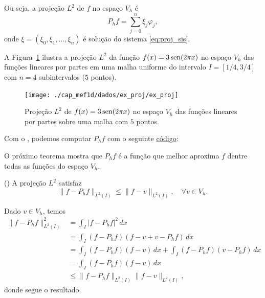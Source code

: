 Ou seja, a projeção $L^2$ de $f$ no espaço $V_h$ é
\begin{equation}
  P_hf = \sum_{j=0}^n\xi_j\varphi_j,
\end{equation}
onde $\xi = (\xi_0, \xi_1, \dotsc, \xi_n)$ é solução do sistema \eqref{eq:proj_sis}.

\begin{ex}\label{ex:proj}
  A Figura~\ref{fig:ex_proj} ilustra a projeção $L^2$ da função $f(x)=3\operatorname{sen}(2\pi x)$ no espaço $V_h$ das funções lineares por partes em uma malha uniforme do intervalo $I=[1/4, 3/4]$ com $n=4$ subintervalos ($5$ pontos). 

  \begin{figure}[h!]
    \centering
    \texttt{[image: ./cap\_mef1d/dados/ex\_proj/ex\_proj]}
    \caption{Projeção $L^2$ de $f(x)=3\operatorname{sen}(2\pi x)$ no espaço $V_h$ das funções lineares por partes sobre uma malha com $5$ pontos.}
    \label{fig:ex_proj}
  \end{figure}

\ifispython
Com o \fenics, podemos computar $P_h f$ com o seguinte \href{https://github.com/phkonzen/notas/blob/master/src/MetodoElementosFinitos/cap_mef1d/dados/ex_proj/ex_proj.py}{código}:

\fi
\end{ex}

O próximo teorema mostra que $P_h f$ é a função que melhor aproxima $f$ dentre todas as funções do espaço $V_h$.

\begin{teo}()\label{teo:melhor_aprox}
  A projeção $L^2$ satisfaz
  \begin{equation}
    \|f-P_hf\|_{L^2(I)} \leq \|f - v\|_{L^2(I)},\quad\forall v\in V_h.
  \end{equation}
\end{teo}
\begin{dem}
  Dado $v\in V_h$, temos
  \begin{align}
    \|f-P_hf\|_{L^2(I)}^2 &= \int_I |f-P_hf|^2\,dx\\
    &= \int_I (f-P_hf)(f-v+v-P_hf)\,dx\\
    &= \int_I(f-P_hf)(f-v)\,dx + \int_I(f-P_hf)(v-P_hf)\,dx\\
    &= \int_I (f-P_hf)(f-v)\,dx\\
    &\leq \|f-P_hf\|_{L^2(I)}\|f-v\|_{L^2(I)},
  \end{align}
donde segue o resultado.
\end{dem}

